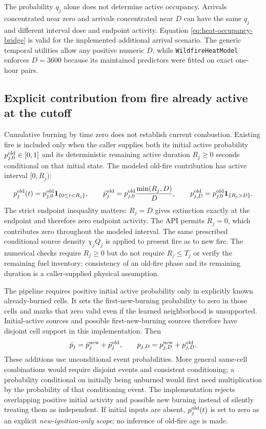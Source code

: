 \documentclass[11pt,a4paper]{article}
\newcommand{\Ind}{\mathbf{1}}
\begin{document}
The probability $q_j$ alone does not determine active occupancy. Arrivals
concentrated near zero and arrivals concentrated near $D$ can have the same
$q_j$ and different interval dose and endpoint activity. Equation
\eqref{eq:heat-occupancy-bridge} is valid for the implemented additional
arrival scenario. The generic temporal utilities allow any positive numeric
$D$, while \texttt{WildfireHeatModel} enforces $D=3600$ because its maintained
predictors were fitted on exact one-hour pairs.

\subsection{Explicit contribution from fire already active at the cutoff}
\label{sec:heat-present}

Cumulative burning by time zero does not establish current combustion.
Existing fire is included only when the caller supplies both its
initial active probability $p_{j,0}^{\rm old}\in[0,1]$ and its deterministic
remaining active duration $R_j\ge0$ seconds conditional on that initial
state. The modeled old-fire contribution has active interval $[0,R_j)$:
\begin{equation}
 p_j^{\rm old}(t)=p_{j,0}^{\rm old}\Ind_{\{0\le t<R_j\}},
 \qquad
 \bar p_j^{\rm old}=p_{j,0}^{\rm old}\frac{\min(R_j,D)}{D},
 \qquad
 p_{j,D}^{\rm old}=p_{j,0}^{\rm old}\Ind_{\{R_j>D\}}.
 \label{eq:heat-initial-occupancy}
\end{equation}
The strict endpoint inequality matters: $R_j=D$ gives extinction exactly
at the endpoint and therefore zero endpoint activity. The API permits
$R_j=0$, which contributes zero throughout the modeled interval. The same
prescribed conditional source density $\chi_jQ_j$ is applied to present
fire as to new fire. The numerical checks require $R_j\ge0$ but do not
require $R_j\le T_j$ or verify the remaining fuel inventory; consistency
of an old-fire phase and its remaining duration is a caller-supplied
physical assumption.

The pipeline requires positive initial active probability only in explicitly
known already-burned cells. It sets the first-new-burning probability to zero
in those cells and marks that zero valid even if the learned neighborhood is
unsupported. Initial-active sources and possible first-new-burning sources
therefore have disjoint cell support in this implementation. Then
\begin{equation}
 \bar p_j=\bar p_j^{\rm new}+\bar p_j^{\rm old},
 \qquad p_{j,D}=p_{j,D}^{\rm new}+p_{j,D}^{\rm old}.
\end{equation}
These additions use unconditional event probabilities. More general
same-cell combinations would require disjoint events and consistent
conditioning; a probability conditional on initially being unburned would
first need multiplication by the probability of that conditioning event.
The implementation rejects overlapping positive initial activity and
possible new burning instead of silently treating them as independent.
If initial inputs are absent, $p_j^{\rm old}(t)$ is set to zero as an explicit
\emph{new-ignition-only scope}; no inference of old-fire age is made.
\end{document}
